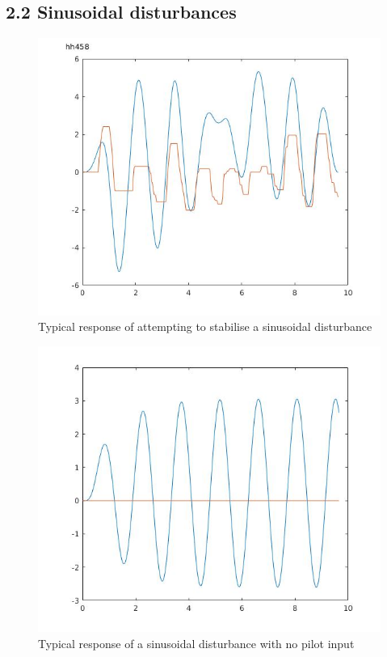 \documentclass[twoside,twocolumn]{article}
\begin{document}
\subsection{2.2 Sinusoidal disturbances}
\begin{figure}[h]
  \centering
    \includegraphics[width=\linewidth]{2-2}
  \caption{Typical response of attempting to stabilise a sinusoidal disturbance}
  \label{fig:2-2input}
\end{figure}

\begin{figure}[h]
  \centering
    \includegraphics[width=\linewidth]{2-2-2}
  \caption{Typical response of a sinusoidal disturbance with no pilot input}
  \label{fig:2-2zero}
\end{figure}
\end{document}
